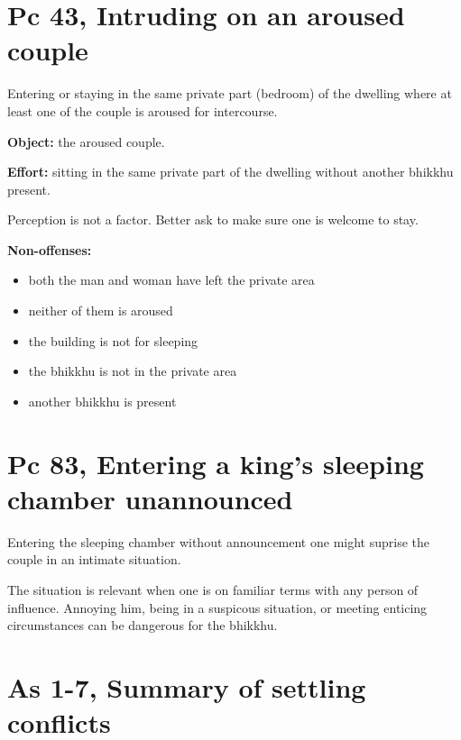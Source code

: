 \section{Pc 43, Intruding on an aroused couple}

\begin{multicols}{2}

Entering or staying in the same private part (bedroom) of the dwelling
where at least one of the couple is aroused for intercourse.

\textbf{Object:} the aroused couple.

\textbf{Effort:} sitting in the same private part of the dwelling
without another bhikkhu present.

Perception is not a factor. Better ask to make sure one is welcome to
stay.

\textbf{Non-offenses:}

\begin{itemize}
\tightlist
\item
  both the man and woman have left the private area
\item
  neither of them is aroused
\item
  the building is not for sleeping
\item
  the bhikkhu is not in the private area
\item
  another bhikkhu is present
\end{itemize}

\end{multicols}

\section{Pc 83, Entering a king's sleeping chamber unannounced}

\begin{multicols}{2}

Entering the sleeping chamber without announcement one might suprise the
couple in an intimate situation.

The situation is relevant when one is on familiar terms with any person
of influence. Annoying him, being in a suspicous situation, or meeting
enticing circumstances can be dangerous for the bhikkhu.

\end{multicols}

\section{As 1-7, Summary of settling conflicts}

